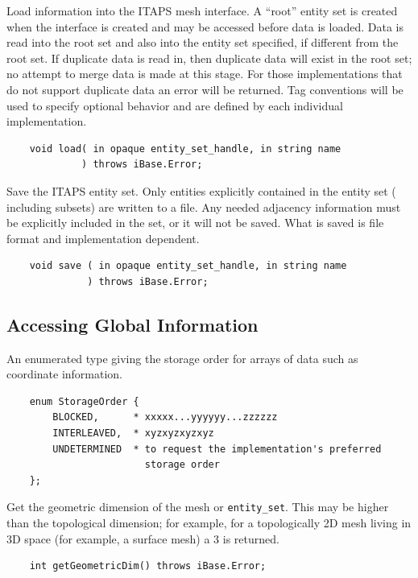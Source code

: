 \documentclass{article}
\begin{document}
Load information into the ITAPS mesh interface. A ``root'' entity 
set is created when the interface is created and may be accessed 
before data is loaded. Data is read into the root set and also 
into the entity set specified, if different from the root set. 
If duplicate data is read in, then duplicate data will exist 
in the root set; no attempt to merge data is made at this stage. 
For those implementations that do not support duplicate data 
an error will be returned. Tag conventions will be used to specify 
optional behavior and are defined by each individual implementation. 

\begin{verbatim}
    void load( in opaque entity_set_handle, in string name
             ) throws iBase.Error;
\end{verbatim}

Save the ITAPS entity set. Only entities explicitly contained in 
the entity set ( including subsets) are written to a file. Any 
needed adjacency information must be explicitly included in the 
set, or it will not be saved. What is saved is file format and 
implementation dependent.

\begin{verbatim}
    void save ( in opaque entity_set_handle, in string name
              ) throws iBase.Error;
\end{verbatim}


\subsection{Accessing Global Information}

An enumerated type giving the storage order for arrays of data 
such as coordinate information.


\begin{verbatim}
    enum StorageOrder { 
        BLOCKED,      * xxxxx...yyyyyy...zzzzzz 
        INTERLEAVED,  * xyzxyzxyzxyz   
        UNDETERMINED  * to request the implementation's preferred
                        storage order
    };
\end{verbatim}

Get the geometric dimension of the mesh or {\tt entity\_set}. This 
may be higher than the topological dimension; for example, for a topologically 
2D mesh living in 3D space (for example, a surface mesh) a 3 is 
returned.
    
\begin{verbatim}    
    int getGeometricDim() throws iBase.Error;
\end{verbatim}
\end{document}
